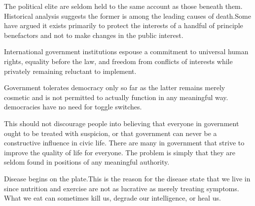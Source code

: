
The political elite are seldom held to the same account as those beneath them.
Historical analysis suggests the former is among the leading causes of death. Some have argued it exists primarily to protect the interests of a handful of principle benefactors
\footnotecite[wilson2007]
\footnotecite[bowie2012]
\footnotecite[favel2008]
and not to make changes in the public interest.

International government institutions espouse a commitment to universal human rights, equality before the law, and freedom from conflicts of interests while privately remaining reluctant to implement.

Government tolerates democracy only so far as the latter remains merely cosmetic and is not permitted to actually function in any meaningful way. democracies have no need for toggle switches.

This should not discourage people into believing that everyone in government ought to be treated with suspicion, or that government can never be a constructive influence in civic life. There are many in government that strive to improve the quality of life for everyone. The problem is simply that they are seldom found in positions of any meaningful authority.


Disease begins on the plate. This is the reason for the disease state that we live in since nutrition and exercise are not as lucrative as merely treating symptoms. What we eat can sometimes kill us,
degrade our intelligence,
or heal us.
\footnotecite[cavusoglu2009]

